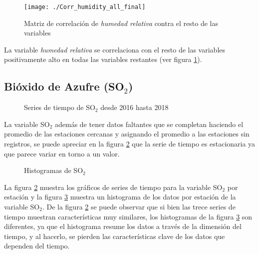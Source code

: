 \begin{figure}[H]
\centering
\texttt{[image: ./Corr\_humidity\_all\_final]}
\caption{Matriz de correlación de {\em humedad relativa} contra el resto de las variables}
\label{corrhumidity}
\end{figure}

La variable {\em humedad relativa} se correlaciona con el resto de las variables positivamente alto en todas las variables restantes (ver figura \ref{corrhumidity}).




\subsection{Bióxido de Azufre (SO$_{2}$)}
\begin{figure}[H]
\centering
{}
\caption{Series de tiempo de SO$_{2}$ desde 2016 hasta 2018}
\label{serieSO2}
\end{figure}

La variable SO$_{2}$ además de tener datos faltantes que se completan haciendo el promedio de las estaciones cercanas y asignando el promedio a las estaciones sin registros, se puede apreciar en la figura \ref{serieSO2} que la serie de tiempo es estacionaria ya que parece variar en torno a un valor.

\begin{figure}[H]
\centering
{}
\caption{Histogramas de SO$_{2}$}
\label{histSO2}
\end{figure}

La figura \ref{serieSO2} muestra los gráficos de series de tiempo para la variable SO$_{2}$ por estación y la figura \ref{histSO2} muestra un histograma de los datos por estación de la variable SO$_{2}$. De la figura \ref{serieSO2} se puede observar que si bien las trece series de tiempo muestran características muy similares, los histogramas de la figura \ref{histSO2} son diferentes, ya que el histograma resume los datos a través de la dimensión del tiempo, y al hacerlo, se pierden las características clave de los datos que dependen del tiempo.

